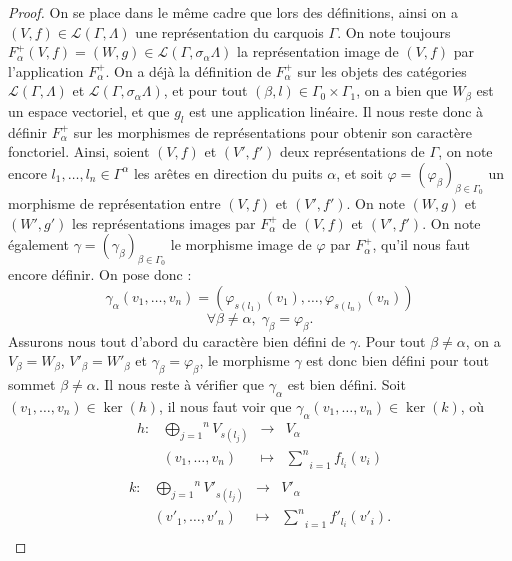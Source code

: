 \documentclass[a4paper,10pt]{article}
\begin{document}
\begin{proof}
	On se place dans le même cadre que lors des définitions, ainsi on a $(V,f)\in\mathscr{L}(\Gamma,\Lambda)$ une représentation du carquois $\Gamma$. On note toujours $F_{\alpha}^{+}(V,f)=(W,g)\in\mathscr{L}(\Gamma,\sigma_{\alpha}\Lambda)$ la représentation image de $(V,f)$ par l'application $F_{\alpha}^{+}$. On a déjà la définition de $F_{\alpha}^{+}$ sur les objets des catégories $\mathscr{L}(\Gamma,\Lambda)$ et $\mathscr{L}(\Gamma,\sigma_{\alpha}\Lambda)$, et pour tout $(\beta,l)\in\Gamma_{0}\times\Gamma_{1}$, on a bien que $W_{\beta}$ est un espace vectoriel, et que $g_{l}$ est une application linéaire. Il nous reste donc à définir $F_{\alpha}^{+}$ sur les morphismes de représentations pour obtenir son caractère fonctoriel. Ainsi, soient $(V,f)$ et $(V',f')$ deux représentations de $\Gamma$, on note encore $l_{1},\dots,l_{n}\in\Gamma^{\alpha}$ les arêtes en direction du puits $\alpha$, et soit $\varphi=(\varphi_{\beta})_{\beta\in\Gamma_{0}}$ un morphisme de représentation entre $(V,f)$ et $(V',f')$. On note $(W,g)$ et $(W',g')$ les représentations images par $F_{\alpha}^{+}$ de $(V,f)$ et $(V',f')$. On note également $\gamma=(\gamma_{\beta})_{\beta\in\Gamma_{0}}$ le morphisme image de $\varphi$ par $F_{\alpha}^{+}$, qu'il nous faut encore définir. On pose donc :
	\[	
		\gamma_{\alpha}(v_{1},\dots,v_{n})=(\varphi_{s(l_{1})}(v_{1}),\dots,\varphi_{s(l_{n})}(v_{n}))
	\]
	\[
		\forall \beta\neq\alpha,\; \gamma_{\beta}=\varphi_{\beta}.
	\]
	Assurons nous tout d'abord du caractère bien défini de $\gamma$. Pour tout $\beta\neq\alpha$, on a $V_{\beta}=W_{\beta}$, $V'_{\beta}=W'_{\beta}$ et $\gamma_{\beta}=\varphi_{\beta}$, le morphisme $\gamma$ est donc bien défini pour tout sommet $\beta\neq\alpha$. Il nous reste à vérifier que $\gamma_{\alpha}$ est bien défini. Soit $(v_{1},\dots,v_{n})\in\ker(h)$, il nous faut voir que $\gamma_{\alpha}(v_{1},\dots,v_{n})\in\ker(k)$, où
	\[
\begin{array}{lccc}
	h : & \overset{n}{\underset{j=1}{\bigoplus}}V_{s(l_{j})}&\rightarrow & V_{\alpha} \\ 
	& (v_{1},\dots,v_{n})&\mapsto & \underset{i=1}{\overset{n}{\sum}}f_{l_{i}}(v_{i})\\
\end{array}
	\]	
	\[
\begin{array}{lccc}
	k : & \overset{n}{\underset{j=1}{\bigoplus}}V'_{s(l_{j})}&\rightarrow & V'_{\alpha} \\ 
	& (v'_{1},\dots,v'_{n})&\mapsto & \underset{i=1}{\overset{n}{\sum}}f'_{l_{i}}(v'_{i}).\\

\end{array}\]
\end{proof}
\end{document}
